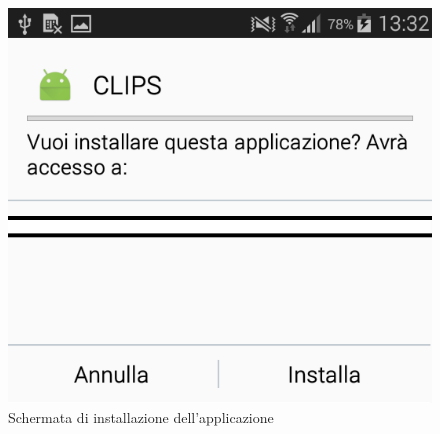 \documentclass[../ClipsManualeUtente.tex]{subfiles}
\begin{document}
			\vfill
			\begin{figure} [h]
				\centering
				\includegraphics[scale=0.3]{img/Installa_}
				\caption{Schermata di installazione dell'applicazione}
				\label{fig:Installa}
			\end{figure}
			\vfill
		
		
\end{document}
